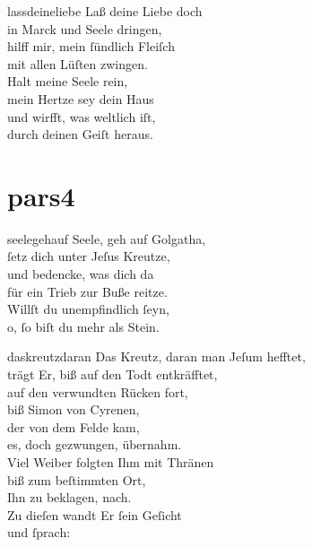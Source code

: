 \documentclass[tocstyle=ref-genre]{ees}
\begin{document}
{\begin{movement}{lassdeineliebe}
  \voice[Coro]
  Laß deine Liebe doch\\
  in Marck und Seele dringen,\\
  hilff mir, mein ſündlich Fleiſch\\
  mit allen Lüſten zwingen.\\
  Halt meine Seele rein,\\
  mein Hertze sey dein Haus\\
  und wirfft, was weltlich iſt,\\
  durch deinen Geiſt heraus.
\end{movement}

\clearpage
\part{pars4}

\begin{movement}{seelegehauf}
  \voice[Coro]
  Seele, geh auf Golgatha,\\
  ſetz dich unter Jeſus Kreutze,\\
  und bedencke, was dich da\\
  für ein Trieb zur Buße reitze.\\
  Willſt du unempfindlich ſeyn,\\
  o, ſo biſt du mehr als Stein.
\end{movement}

\begin{movement}{daskreutzdaran}
  Das Kreutz, daran man Jeſum hefftet,\\
  trägt Er, biß auf den Todt entkräfftet,\\
  auf den verwundten Rücken fort,\\
  biß Simon von Cyrenen,\\
  der von dem Felde kam,\\
  es, doch gezwungen, übernahm.\\
  Viel Weiber folgten Ihm mit Thränen\\
  biß zum beſtimmten Ort,\\
  Ihn zu beklagen, nach.\\
  Zu dieſen wandt Er ſein Geſicht\\
  und ſprach:
\end{movement}

}
\end{document}
